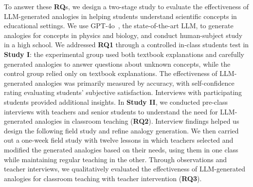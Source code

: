 To answer these \textbf{RQ}s, we design a two-stage study to evaluate the effectiveness of LLM-generated analogies in helping students understand scientific concepts in educational settings.
We use GPT-4o~\cite{openai_gpt-4_2023}, the state-of-the-art LLM, to generate analogies for concepts in physics and biology, and conduct human-subject study in a  high school.
We addressed \textbf{RQ1} through a controlled in-class students test in \textbf{Study I}: the experimental group used both textbook explanations and carefully generated analogies to answer questions about unknown concepts, while the control group relied only on textbook explanations.
The effectiveness of LLM-generated analogies was primarily measured by accuracy, with self-confidence rating evaluating students' subjective satisfaction. 
Interviews with participating students provided additional insights.
In \textbf{Study II}, we conducted pre-class interviews with teachers and senior students to understand the need for LLM-generated analogies in classroom teaching (\textbf{RQ2}). 
Interview findings helped us design the following field study and refine analogy generation.
We then carried out a one-week field study with twelve lessons in which teachers selected and modified the generated analogies based on their needs, using them in one class while maintaining regular teaching in the other.
Through observations and teacher interviews, we qualitatively evaluated the effectiveness of LLM-generated analogies for classroom teaching with teacher intervention (\textbf{RQ3}).



